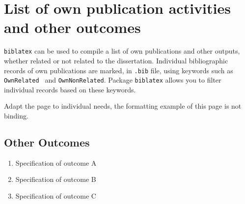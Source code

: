 \chapter*{List of own publication activities and other outcomes}
\label{sec:ListOfStudentsOwnPublicationActivitiesAndOtherOutcomes}
\verb|biblatex| can be used to compile a list of own publications and other outputs, whether related or not related to the dissertation. Individual bibliographic records of own publications are marked, in \verb|.bib| file, using keywords such as \verb|OwnRelated | and \verb|OwnNonRelated|. Package \verb|biblatex| allows you to filter individual records based on these keywords.

Adapt the page to individual needs, the formatting example of this page is not binding.

\begin{refsection}
\nocite{MyRelatedArticle1, MyRelatedArticle2}
\printbibliography[keyword={OwnRelated}, heading=subbibintoc, title={Publications and Outcomes Related to Thesis}]
\end{refsection}

\begin{refsection}
\nocite{MyNonrelatedArticle1}
\printbibliography[keyword={OwnNonRelated}, heading=subbibintoc, title={Publications and Outcomes Not Related to Thesis}]
\end{refsection}

\section*{Other Outcomes}
\begin{enumerate}
	\item Specification of outcome A
	\item Specification of outcome B
	\item Specification of outcome C
\end{enumerate}



